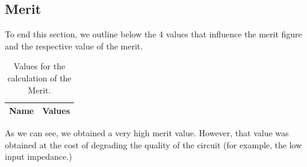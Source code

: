 \subsection{Merit}
To end this section, we outline below the 4 values that influence the merit figure and the respective value of the merit.

\begin{table}[H]
  \centering
  \begin{tabular}{|l|r|}
    \hline    
    {\bf Name} & {\bf Values} \\ \hline
    
  \end{tabular}
  \caption{Values for the calculation of the Merit.}
\end{table}

As we can see, we obtained a very high merit value. However, that value was obtained at the cost of degrading the quality of the circuit (for example, the low input impedance.)


